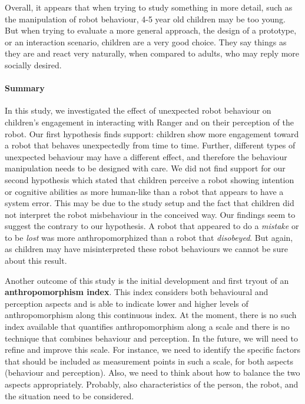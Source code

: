 \documentclass{sig-alternate}
\begin{document}
Overall, it appears that when trying to study something in more detail, such as
the manipulation of robot behaviour, 4-5 year old children may be too young. But
when trying to evaluate a more general approach, the design of a prototype, or
an interaction scenario, children are a very good choice. They say things as
they are and react very naturally, when compared to adults, who may reply more
socially desired. 


\paragraph{Summary}

In this study, we investigated the effect of unexpected robot behaviour on
children's engagement in interacting with Ranger and on their perception of the
robot.  Our first hypothesis finds support: children show more engagement toward
a robot that behaves unexpectedly from time to time. Further, different types of
unexpected behaviour may have a different effect, and therefore the behaviour
manipulation needs to be designed with care.
We did not find support for our second hypothesis which stated that children
perceive a robot showing intention or cognitive abilities as more human-like
than a robot that appears to have a system error. This may be due to the study
setup and the fact that children did not interpret the robot misbehaviour in the
conceived way. Our findings seem to suggest the contrary to our hypothesis. A
robot that appeared to do a \textit{mistake} or to be \textit{lost} was more
anthropomorphized than a robot that \textit{disobeyed}. But again, as children
may have misinterpreted these robot behaviours we cannot be sure about this
result.

Another outcome of this study is the initial development and first tryout of an
\textbf{anthropomorphism index}. This index considers both behavioural and
perception aspects and is able to indicate lower and higher levels of
anthropomorphism along this continuous index. At the moment, there is no such
index available that quantifies anthropomorphism along a scale and there is no
technique that combines behaviour and perception. In the future, we will need to refine
and improve this scale. For instance, we need to identify the specific factors
that should be included as measurement points in such a scale, for both aspects
(behaviour and perception). Also, we need to think about how to balance the two
aspects appropriately. Probably, also characteristics of the person, the robot,
and the situation need to be considered. 
\end{document}
